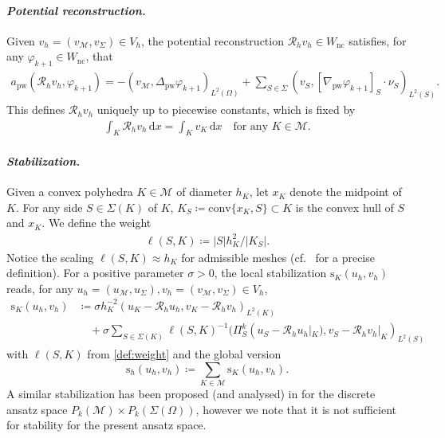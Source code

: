 \documentclass[a4paper]{amsart}
\numberwithin{equation}{section}
\renewcommand{\d}[1]{\,\mathrm{d}#1}
\newcommand{\Mcal}{\mathcal{M}}
\newcommand{\s}{\mathrm{s}}
\newcommand{\pw}{\mathrm{pw}}
\theoremstyle{remark}
\theoremstyle{definition}
\theoremstyle{assumptionnoperiod}
\begin{document}
\paragraph{\emph{Potential reconstruction.}}
Given $v_h = (v_\Mcal, v_\Sigma) \in V_h$, the potential reconstruction $\mathcal{R}_h v_h \in W_\mathrm{nc}$ satisfies, for any $\varphi_{k+1} \in W_\mathrm{nc}$, that
\begin{align}\label{def:potential-reconstruction-1}
	a_\pw(\mathcal{R}_h v_h, \varphi_{k+1}) = - (v_\mathcal{M}, \Delta_\pw \varphi_{k+1})_{L^2(\Omega)} + \sum_{S \in \Sigma} (v_S, [\nabla_\pw \varphi_{k+1}]_S \cdot \nu_S)_{L^2(S)}.
\end{align}
This defines $\mathcal{R}_h v_h$ uniquely up to piecewise constants, which is fixed by
\begin{align}\label{def:pot-rec-2}
	\int_K \mathcal{R}_h v_h \d{x} = \int_K v_K \d{x} \quad\text{for any } K \in \Mcal.
\end{align}

\paragraph{\emph{Stabilization.}}
Given a convex polyhedra $K \in \Mcal$ of diameter $h_K$, let $x_K$ denote the midpoint of $K$. For any side $S \in \Sigma(K)$ of $K$, $K_S \coloneqq \mathrm{conv}\{x_K,S\} \subset K$ is the convex hull of $S$ and $x_K$.
We define the weight
\begin{align}\label{def:weight}
	\ell(S,K) \coloneqq |S| h_K^2/|K_S|.
\end{align}
Notice the scaling $\ell(S,K) \approx h_K$ for admissible meshes (cf.~\cite[Definition 1.38]{DiPietroErn2012} for a precise definition).
For a positive parameter $\sigma > 0$, the local stabilization $\s_K(u_h,v_h)$ reads,
for any $u_h = (u_\mathcal{M}, u_\Sigma), v_h = (v_\mathcal{M}, v_\Sigma) \in V_h$,
\begin{align}\label{def:stabilization}
	\s_K(u_h, v_h) &\coloneqq \sigma h_K^{-2}(u_K - \mathcal{R}_h u_h, v_K - \mathcal{R}_h v_h)_{L^2(K)}\nonumber\\
	&\quad + \sigma \sum_{S \in \Sigma(K)} \ell(S,K)^{-1} (\Pi_S^k(u_S - \mathcal{R}_h u_h|_K), v_S - \mathcal{R}_h v_h|_K)_{L^2(S)}
\end{align}
with $\ell(S,K)$ from \eqref{def:weight} and the global version $$\s_h(u_h, v_h) \coloneqq \sum_{K \in \mathcal{M}} \s_K(u_h,v_h).$$
A similar stabilization has been proposed (and analysed) in \cite[Example 2.8]{DiPietroDroniou2020} for the discrete ansatz space $P_{k}(\Mcal) \times P_k(\Sigma(\Omega))$, however we note that it is not sufficient for stability for the present ansatz space.\\[-0.5em]
\end{document}

